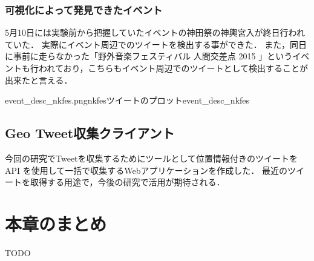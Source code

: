 \subsubsection{可視化によって発見できたイベント}
5月10日には実験前から把握していたイベントの神田祭の神輿宮入が終日行われていた\cite{webpage_kanda}．
実際にイベント周辺でのツイートを検出する事ができた．
また，同日に事前に走らなかった「野外音楽フェスティバル 人間交差点 2015 \cite{webpage_nkfes}」というイベントも行われており，こちらもイベント周辺でのツイートとして検出することが出来たと言える．

{event_desc_nkfes.png}{nkfesツイートのプロット}{event_desc_nkfes}

\subsection{Geo Tweet収集クライアント}
今回の研究でTweetを収集するためにツールとして位置情報付きのツイートを API を使用して一括で収集するWebアプリケーションを作成した．
最近のツイートを取得する用途で，今後の研究で活用が期待される．


\newpage

\section{本章のまとめ}
TODO




\newpage
